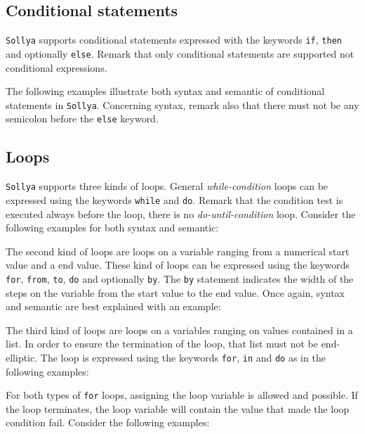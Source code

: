 \documentclass[a4paper]{article}
\newcommand{\key}[1]{\texttt{#1}}
\newcommand{\sollya}{\texttt{Sollya}\xspace}
\begin{document}


\subsection{Conditional statements}

\sollya supports conditional statements expressed with the keywords
\key{if}, \key{then} and optionally \key{else}. Remark that only
conditional statements are supported not conditional expressions. 

The following examples illustrate both syntax and semantic of
conditional statements in \sollya. Concerning syntax, remark also that there must not be any semicolon
before the \key{else} keyword.



\subsection{Loops}

\sollya supports three kinds of loops. General \emph{while-condition}
loops can be expressed using the keywords \key{while} and
\key{do}. Remark that the condition test is executed always before the
loop, there is no \emph{do-until-condition} loop. Consider the following 
examples for both syntax and semantic:



The second kind of loops are loops on a variable ranging from a
numerical start value and a end value. These kind of loops can be
expressed using the keywords \key{for}, \key{from}, \key{to}, \key{do}
and optionally \key{by}. The \key{by} statement indicates the width of
the steps on the variable from the start value to the end value. Once
again, syntax and semantic are best explained with an example:



The third kind of loops are loops on a variables ranging on values
contained in a list. In order to ensure the termination of the loop,
that list must not be end-elliptic. The loop is expressed using the
keywords \key{for}, \key{in} and \key{do} as in the following
examples:



For both types of \key{for} loops, assigning the loop variable is
allowed and possible. If the loop terminates, the loop variable will
contain the value that made the loop condition fail. Consider the
following examples:
\end{document}

